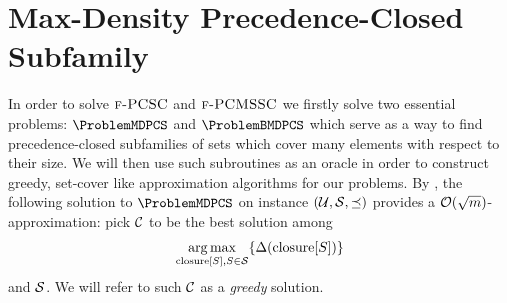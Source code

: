 \section{Max-Density Precedence-Closed Subfamily} \label{sec:MDPCS}

In order to solve $\textup{\textsc{f-PCSC}}$ and $\textup{\textsc{f-PCMSSC}}$ we firstly solve two essential problems: $\ProblemMDPCS$ and $\ProblemBMDPCS$ which serve as a way to find precedence-closed subfamilies of sets which cover many elements with respect to their size. We will then use such subroutines as an oracle in order to construct greedy, set-cover like approximation algorithms for our problems.
By \cite{PCMSSC}, the following solution to $\ProblemMDPCS$ on instance $\mathopen{}\left( \mathcal{U},\mathcal{S},\preceq \right)$ provides a $\mathcal{O}\mathopen{}\left( \sqrt{m} \right)$-approximation: pick $\mathcal{C}$ to be the best solution among
\[
\mathopen{}\operatorname*{arg\,max}_{\operatorname{closure}[S], S\in\mathcal{S}} \mathopen{}\left\{ \Delta\mathopen{}\left( \operatorname{closure}[S] \right) \right\}
\]
and $\mathcal{S}$.
We will refer to such $\mathcal{C}$ as a \emph{greedy} solution.
%


